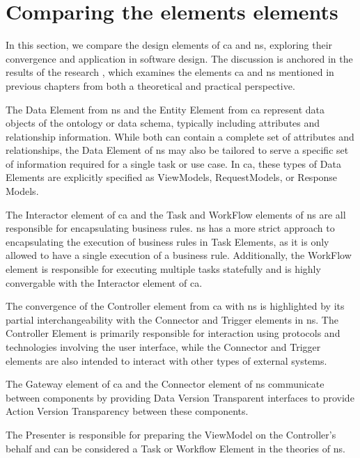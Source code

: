 \section{Comparing the elements elements}

In this section, we compare the design elements of \gls{ca} and \gls{ns}, exploring their
convergence and application in software design. The discussion is anchored in the results
of the research   \cite{koks_convergence_2023}, which
examines the elements \gls{ca} and \gls{ns} mentioned in previous chapters from both a
theoretical and practical perspective.

The Data Element from \gls{ns} and the Entity Element from \gls{ca} represent data objects
of the ontology or data schema, typically including attributes and relationship
information. While both can contain a complete set of attributes and relationships, the
Data Element of \gls{ns} may also be tailored to serve a specific set of information
required for a single task or use case. In \gls{ca}, these types of Data Elements are
explicitly specified as ViewModels, RequestModels, or Response Models.

The Interactor element of \gls{ca} and the Task and WorkFlow elements of \gls{ns} are all
responsible for encapsulating business rules. \gls{ns} has a more strict approach to
encapsulating the execution of business rules in Task Elements, as it is only allowed to
have a single execution of a business rule. Additionally, the WorkFlow element is
responsible for executing multiple tasks statefully and is highly convergable with the
Interactor element of \gls{ca}.

The convergence of the Controller element from \gls{ca} with \gls{ns} is highlighted by
its partial interchangeability with the Connector and Trigger elements in \gls{ns}. The
Controller Element is primarily responsible for interaction using protocols and
technologies involving the user interface, while the Connector and Trigger elements are
also intended to interact with other types of external systems.
 
The Gateway element of \gls{ca} and the Connector element of \gls{ns} communicate between
components by providing Data Version Transparent interfaces to provide Action Version
Transparency between these components.

The Presenter is responsible for preparing the ViewModel on the Controller's behalf and
can be considered a Task or Workflow Element in the theories of \gls{ns}.

